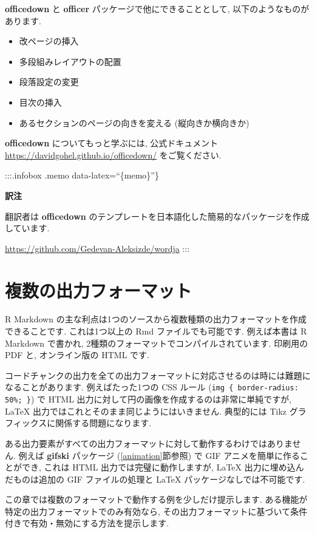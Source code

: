 \documentclass[
  11pt,
  lualatex,ja=standard,jafont=noto]{bxjsreport}
\begin{document}
\textbf{officedown} と \textbf{officer} パッケージで他にできることとして, 以下のようなものがあります.

\begin{itemize}
\item
  改ページの挿入
\item
  多段組みレイアウトの配置
\item
  段落設定の変更
\item
  目次の挿入
\item
  あるセクションのページの向きを変える (縦向きか横向きか)
\end{itemize}

\textbf{officedown} についてもっと学ぶには, 公式ドキュメント \url{https://davidgohel.github.io/officedown/} をご覧ください.

:::.infobox .memo data-latex=``\{memo\}''\}

\textbf{訳注}

翻訳者は \textbf{officedown} のテンプレートを日本語化した簡易的なパッケージを作成しています.

\url{https://github.com/Gedevan-Aleksizde/wordja} :::

\hypertarget{multi-formats}{%
\chapter{複数の出力フォーマット}\label{multi-formats}}

R Markdown の主な利点は1つのソースから複数種類の出力フォーマットを作成できることです. これは1つ以上の Rmd ファイルでも可能です. 例えば本書は R Markdown で書かれ, 2種類のフォーマットでコンパイルされています. 印刷用の PDF と, オンライン版の HTML です.

コードチャンクの出力を全ての出力フォーマットに対応させるのは時には難題になることがあります. 例えばたった1つの CSS ルール (\texttt{img \{ border-radius: 50\%; \}}) で HTML 出力に対して円の画像を作成するのは非常に単純ですが, LaTeX 出力ではこれとそのまま同じようにはいきません. 典型的には Tikz グラフィックスに関係する問題になります.

ある出力要素がすべての出力フォーマットに対して動作するわけではありません. 例えば \textbf{gifski} パッケージ \autocite{R-gifski} (\ref{animation}節参照) で GIF アニメを簡単に作ることができ, これは HTML 出力では完璧に動作しますが, LaTeX 出力に埋め込んだものは追加の GIF ファイルの処理と LaTeX パッケージなしでは不可能です.

この章では複数のフォーマットで動作する例を少しだけ提示します. ある機能が特定の出力フォーマットでのみ有効なら, その出力フォーマットに基づいて条件付きで有効・無効にする方法を提示します.
\end{document}
